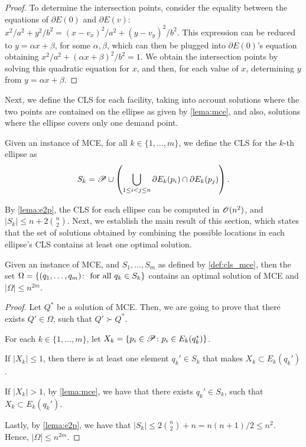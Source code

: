 \begin{proof}
	To determine the intersection points, consider the equality between the equations of $\partial E(0)$ and $\partial E(v)$:
	$x^2/a^2 + y^2/b^2 = (x-v_x)^2/a^2 + (y-v_y)^2/b^2.$
	This expression can be reduced to $y=\alpha x + \beta$, for some $\alpha, \beta$, which can then be plugged into $\partial E(0)$'s equation obtaining $x^2/a^2 + (\alpha x + \beta)^2/b^2 = 1$.
	We obtain the intersection points by solving this quadratic equation for $x$, and then, for each value of $x$,  determining $y$ from $y=\alpha x + \beta$.
\end{proof}
Next, we define the CLS for each facility, taking into account solutions where the two points are contained on the ellipse as given by \autoref{lema:mce}, and also, solutions where the ellipse covers only one demand point.

\begin{definition}\label{def:cls_mce}
	Given an instance of MCE, for all $k \in \{1, \dots, m\}$, we define the CLS for the $k$-th ellipse as
	\begin{equation}
	S_k = \mathscr{P} \cup \left(\bigcup_{1 \le i < j \le n} \partial E_k(p_i) \cap \partial E_k(p_j) \right).
	\end{equation}
\end{definition}

By \autoref{lema:e2p}, the CLS for each ellipse can be computed in $\mathscr{O}(n^2)$, and $|S_k| \le n + 2\binom{n}{2}$. Next, we establish the main result of this section, which states that the set of solutions obtained by combining the possible locations in each ellipse's CLS contains at least one optimal solution.

\begin{thm}\label{thm:mce}
	Given an instance of MCE, and $S_1, \dots, S_m$ as defined by \autoref{def:cls_mce}, then the set $\Omega = \{(q_1, \dots, q_m) \colon \textnormal{ for all }q_k \in S_k \}$ contains an optimal solution of MCE and $|\Omega| \le n^{2m}$. 
\end{thm}
\begin{proof}
	Let $Q^*$ be a solution of MCE. Then, we are going to prove that there exists $Q' \in \Omega$, such that $Q'\succ Q^*$.
	
	For each $k\in \{1, \dots, m\}$, let $X_k = \{p_i \in \mathscr{P}\colon p_i \in E_k(q_k^*)\}$.
	
	
	If $|X_k| \le 1$, then there is at least one element $q_k'\in S_k$ that makes $X_k \subset E_k(q_k')$.
	
	If $|X_k| > 1$, by \autoref{lema:mce}, we have that there exists $q_k' \in S_k$, such that $X_k \subset E_k(q_k')$.
		
	Lastly, by \autoref{lema:e2p}, we have that $|S_k| \le 2\binom{n}{2} + n = n(n+1)/2 \le n^2$. Hence, $|\Omega| \le n^{2m}$.
\end{proof}

